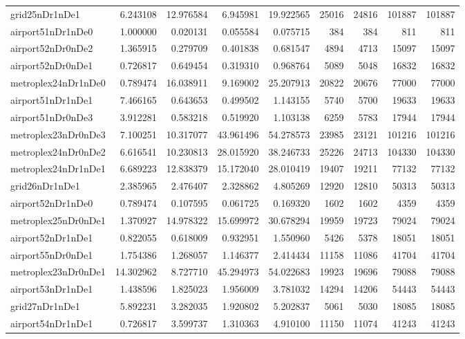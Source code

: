 \begin{longtable}{|l|r|r|r|r|r|r|r|r|}
grid25nDr1nDe1 & 6.243108 & 12.976584 & 6.945981 & 19.922565 & 25016 & 24816 & 101887 & 101887 \\
airport51nDr1nDe0 & 1.000000 & 0.020131 & 0.055584 & 0.075715 & 384 & 384 & 811 & 811 \\
airport52nDr0nDe2 & 1.365915 & 0.279709 & 0.401838 & 0.681547 & 4894 & 4713 & 15097 & 15097 \\
airport52nDr0nDe1 & 0.726817 & 0.649454 & 0.319310 & 0.968764 & 5089 & 5048 & 16832 & 16832 \\
metroplex24nDr1nDe0 & 0.789474 & 16.038911 & 9.169002 & 25.207913 & 20822 & 20676 & 77000 & 77000 \\
airport51nDr1nDe1 & 7.466165 & 0.643653 & 0.499502 & 1.143155 & 5740 & 5700 & 19633 & 19633 \\
airport51nDr0nDe3 & 3.912281 & 0.583218 & 0.519920 & 1.103138 & 6259 & 5783 & 17944 & 17944 \\
metroplex23nDr0nDe3 & 7.100251 & 10.317077 & 43.961496 & 54.278573 & 23985 & 23121 & 101216 & 101216 \\
metroplex24nDr0nDe2 & 6.616541 & 10.230813 & 28.015920 & 38.246733 & 25226 & 24713 & 104330 & 104330 \\
metroplex24nDr1nDe1 & 6.689223 & 12.838379 & 15.172040 & 28.010419 & 19407 & 19211 & 77132 & 77132 \\
grid26nDr1nDe1 & 2.385965 & 2.476407 & 2.328862 & 4.805269 & 12920 & 12810 & 50313 & 50313 \\
airport52nDr1nDe0 & 0.789474 & 0.107595 & 0.061725 & 0.169320 & 1602 & 1602 & 4359 & 4359 \\
metroplex25nDr0nDe1 & 1.370927 & 14.978322 & 15.699972 & 30.678294 & 19959 & 19723 & 79024 & 79024 \\
airport52nDr1nDe1 & 0.822055 & 0.618009 & 0.932951 & 1.550960 & 5426 & 5378 & 18051 & 18051 \\
airport55nDr0nDe1 & 1.754386 & 1.268057 & 1.146377 & 2.414434 & 11158 & 11086 & 41704 & 41704 \\
metroplex23nDr0nDe1 & 14.302962 & 8.727710 & 45.294973 & 54.022683 & 19923 & 19696 & 79088 & 79088 \\
airport53nDr1nDe1 & 1.438596 & 1.825023 & 1.956009 & 3.781032 & 14294 & 14206 & 54443 & 54443 \\
grid27nDr1nDe1 & 5.892231 & 3.282035 & 1.920802 & 5.202837 & 5061 & 5030 & 18085 & 18085 \\
airport54nDr1nDe1 & 0.726817 & 3.599737 & 1.310363 & 4.910100 & 11150 & 11074 & 41243 & 41243 \\

\end{longtable}
